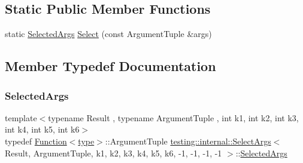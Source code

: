 \subsection*{Static Public Member Functions}
\begin{DoxyCompactItemize}
\item 
static \mbox{\hyperlink{classtesting_1_1internal_1_1SelectArgs_3_01Result_00_01ArgumentTuple_00_01k1_00_01k2_00_01k3_00_bb7097ad0bebc299c171ea7e2f7fc9a0_ad0660960820cc63f7f7a3b78c792c1e3}{Selected\+Args}} \mbox{\hyperlink{classtesting_1_1internal_1_1SelectArgs_3_01Result_00_01ArgumentTuple_00_01k1_00_01k2_00_01k3_00_bb7097ad0bebc299c171ea7e2f7fc9a0_aba440ce5bb12ecbe77716ed1055b660f}{Select}} (const Argument\+Tuple \&args)
\end{DoxyCompactItemize}


\subsection{Member Typedef Documentation}
\mbox{\label{classtesting_1_1internal_1_1SelectArgs_3_01Result_00_01ArgumentTuple_00_01k1_00_01k2_00_01k3_00_bb7097ad0bebc299c171ea7e2f7fc9a0_ad0660960820cc63f7f7a3b78c792c1e3}} 
\subsubsection{\texorpdfstring{SelectedArgs}{SelectedArgs}}
{\footnotesize\ttfamily template$<$typename Result , typename Argument\+Tuple , int k1, int k2, int k3, int k4, int k5, int k6$>$ \\
typedef \mbox{\hyperlink{structtesting_1_1internal_1_1Function}{Function}}$<$\mbox{\hyperlink{classtesting_1_1internal_1_1SelectArgs_3_01Result_00_01ArgumentTuple_00_01k1_00_01k2_00_01k3_00_bb7097ad0bebc299c171ea7e2f7fc9a0_a55ed466f9866d0247c5c9ec8b1bf694f}{type}}$>$\+::Argument\+Tuple \mbox{\hyperlink{classtesting_1_1internal_1_1SelectArgs}{testing\+::internal\+::\+Select\+Args}}$<$ Result, Argument\+Tuple, k1, k2, k3, k4, k5, k6, -\/1, -\/1, -\/1, -\/1 $>$\+::\mbox{\hyperlink{classtesting_1_1internal_1_1SelectArgs_3_01Result_00_01ArgumentTuple_00_01k1_00_01k2_00_01k3_00_bb7097ad0bebc299c171ea7e2f7fc9a0_ad0660960820cc63f7f7a3b78c792c1e3}{Selected\+Args}}}

